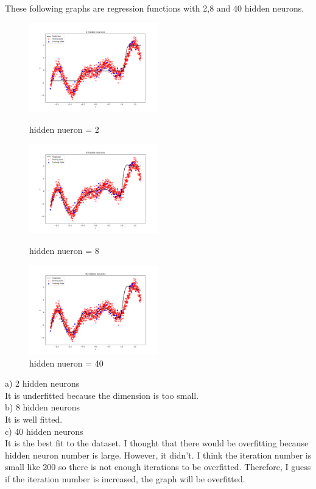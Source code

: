 \documentclass[a4paper]{article}
\begin{document}
These following graphs are regression functions with 2,8 and 40 hidden neurons.\\
\begin{figure}[h]
\includegraphics[width=0.5\textwidth]{ex_1_1_a_2.png}
\caption{hidden nueron = 2}
\includegraphics[width=0.5\textwidth]{ex_1_1_a_8.png}
\caption{hidden nueron = 8}
\includegraphics[width=0.5\textwidth]{ex_1_1_a_40.png}
\caption{hidden nueron = 40}
\end{figure}

\noindent
a) 2 hidden neurons \\
It is underfitted because the dimension is too small.\\

\noindent
b) 8 hidden neurons\\
It is well fitted. \\

\noindent
c) 40 hidden neurons \\
It is the best fit to the dataset. I thought that there would be overfitting because hidden neuron number is large. However, it didn't. I think the iteration number is small like 200 so there is not enough iterations to be overfitted. Therefore, I guess if the iteration number is increased, the graph will be overfitted.\\
\end{document}
